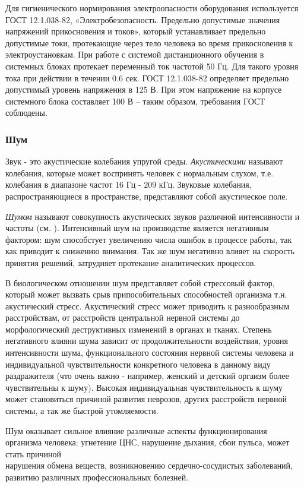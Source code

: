 Для гигиенического нормирования электроопасности оборудования исполь\-зуется ГОСТ 12.1.038-82, «Электробезопасность. Предельно допустимые значе\-ния напряжений  прикос\-новения и токов», который устанавливает предельно допустимые токи, протекающие через тело человека во время прикосновения к электроустановкам.
При работе с системой дистан\-ционного обучения в сис\-темных блоках протекает переменный ток частотой 50 Гц. Для такого уровня тока при действии в течении 0.6 сек. ГОСТ 12.1.038-82 определяет предельно допустимый уровень напряжения в 125 В. При этом напряжение на корпусе системного блока составляет 100 В – таким образом, требования ГОСТ соблю\-дены.

\subsubsection{Шум}

Звук - это акустические колебания упругой среды. {\itshape Акустическими} на\-зывают колебания, которые может воспринять человек с нормальным слухом, т.е. колебания в диапазоне частот $16$ Гц - $209$ кГц. Звуковые колебания, распро\-страняющиеся в пространстве, предста\-вляют собой акустическое поле.

{\itshape Шумом} называют совокупность акустических звуков различной интен\-сивности и часто\-ты (см. \cite{10.}). Интенсивный шум на производстве является негативным фактором: шум способстует увеличению числа ошибок в процессе работы, так как приводит к снижению внимания. Так же шум негативно влияет на скорость принятия решений, затрудняет протекание аналитических процессов.

В биологическом отношении шум представляет собой стрессовый фактор, который может вызвать срыв припособительных способностей организма т.н. акустический стресс. Акустический стресс может приводить к разнообразным расстройствам, от расстройств центральной нервной системы до морфоло\-гический деструктивных изменений в органах и тканях. Степень негативного влияни шума зависит от продолжительности воздействия, уровня интенсив\-ности шума, функционального состояния нервной системы человека и индиви\-дуальной чувствительности конкретного человека в данному виду раздражи\-теля (что очень важно - например, женский и детский оргаизм более чувстви\-тельны к шуму). Высокая индивидуальная чувствительность к шуму может становиться причиной развития неврозов, других расстройств нервной сис\-темы, а так же быстрой утомляемости.

Шум оказывает сильное влияние различные аспекты функционирования организма человека: угнетение ЦНС, нарушение дыхания, сбои пульса, может стать причиной \\нарушения обмена веществ, возникновению сердечно-сосудистых заболеваний, развитию различных профессиональных болезней.

